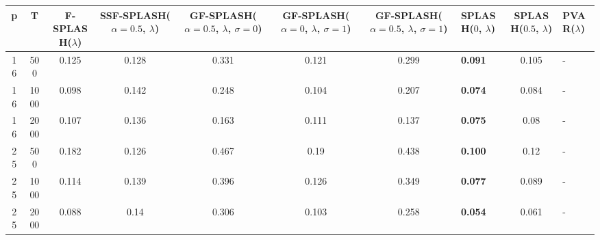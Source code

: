 \begin{tabular}{ccccccclcl}
\hline
  p  &  T   &  F-SPLASH($\lambda$)  &  SSF-SPLASH($\alpha=0.5$, $\lambda$)  &  GF-SPLASH($\alpha=0.5$, $\lambda$, $\sigma=0$)  &  GF-SPLASH($\alpha=0$, $\lambda$, $\sigma=1$)  &  GF-SPLASH($\alpha=0.5$, $\lambda$, $\sigma=1$)  & SPLASH($0$, $\lambda$)   &  SPLASH($0.5$, $\lambda$)  & PVAR($\lambda$)   \\
\hline
 16  & 500  &         0.125         &                 0.128                 &                      0.331                       &                     0.121                      &                      0.299                       & \textbf{0.091}           &           0.105            & -                 \\
 16  & 1000 &         0.098         &                 0.142                 &                      0.248                       &                     0.104                      &                      0.207                       & \textbf{0.074}           &           0.084            & -                 \\
 16  & 2000 &         0.107         &                 0.136                 &                      0.163                       &                     0.111                      &                      0.137                       & \textbf{0.075}           &            0.08            & -                 \\
 25  & 500  &         0.182         &                 0.126                 &                      0.467                       &                      0.19                      &                      0.438                       & \textbf{0.100}           &            0.12            & -                 \\
 25  & 1000 &         0.114         &                 0.139                 &                      0.396                       &                     0.126                      &                      0.349                       & \textbf{0.077}           &           0.089            & -                 \\
 25  & 2000 &         0.088         &                 0.14                  &                      0.306                       &                     0.103                      &                      0.258                       & \textbf{0.054}           &           0.061            & -                 \\
\hline
\end{tabular}